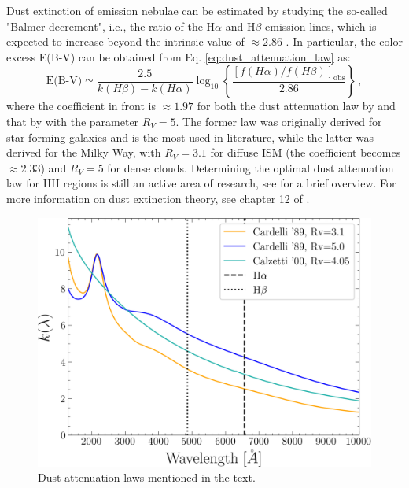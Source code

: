 \documentclass[fleqn,usenatbib]{mnras}
\begin{document}
Dust extinction of emission nebulae can be estimated by studying the so-called "Balmer decrement", i.e., the ratio of the H$\alpha$ and H$\beta$ emission lines, which is expected to increase beyond the intrinsic value of $\approx 2.86$ \citep{Osterbrock_1989}. In particular, the color excess E(B-V) can be obtained from Eq. \ref{eq:dust_attenuation_law} as:
\begin{equation}
  \text{E(B-V)} \simeq \dfrac{2.5}{k(H\beta) - k(H\alpha)} \log_{10} \left\{ \dfrac{\left[{f(H\alpha) / f(H\beta)}\right]_\text{obs}}{2.86} \right\} \, ,
  \label{eq:balmer_decrement}
\end{equation}
where the coefficient in front is $\approx 1.97$ for both the dust attenuation law by \cite{Calzetti_2000} and that by \cite{Cardelli_1989} with the parameter $R_V = 5$. 
The former law was originally derived for star-forming galaxies and is the most used in literature, while the latter was derived for the Milky Way, with $R_V = 3.1$ for diffuse ISM (the coefficient becomes $\approx 2.33$) and $R_V = 5$ for dense clouds.
Determining the optimal dust attenuation law for HII regions is still an active area of research, see \cite{Lin_2024} for a brief overview.
For more information on dust extinction theory, see chapter 12 of \cite{Boselli_2011}.

\begin{figure}\centering
	\includegraphics[width=0.85\columnwidth]{dust_attenuation_laws.png}
    \caption{Dust attenuation laws mentioned in the text.}
    \label{fig:dust_attenuation_laws}
\end{figure}
\end{document}
